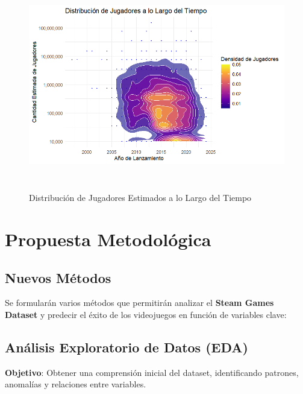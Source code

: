 \documentclass[
  letterpaper,
  DIV=11,
  numbers=noendperiod]{scrreprt}
\begin{document}
\begin{figure}

{\centering \includegraphics[width=138mm,height=92mm]{./imagenes/GrafJoseph2.png}

}

\caption{Distribución de Jugadores Estimados a lo Largo del Tiempo}

\end{figure}

\hypertarget{propuesta-metodoluxf3gica}{%
\section{Propuesta Metodológica}\label{propuesta-metodoluxf3gica}}

\hypertarget{nuevos-muxe9todos}{%
\subsection{Nuevos Métodos}\label{nuevos-muxe9todos}}

Se formularán varios métodos que permitirán analizar el \textbf{Steam
Games Dataset} y predecir el éxito de los videojuegos en función de
variables clave:

\hypertarget{anuxe1lisis-exploratorio-de-datos-eda}{%
\subsection{Análisis Exploratorio de Datos
(EDA)}\label{anuxe1lisis-exploratorio-de-datos-eda}}

\textbf{Objetivo}: Obtener una comprensión inicial del dataset,
identificando patrones, anomalías y relaciones entre variables.
\end{document}
